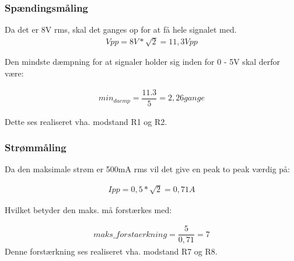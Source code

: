 \subsubsection{Spændingsmåling}
Da det er 8V rms, skal det ganges op for at få hele signalet med.
\begin{align}
Vpp = 8V*\sqrt{2} = 11,3Vpp
\end{align}

Den mindste dæmpning for at signaler holder sig inden for 0 - 5V skal derfor være:

\begin{align}
min_{daemp} = \dfrac{11.3}{5} = 2,26 gange
\end{align}

Dette ses realiseret vha. modstand R1 og R2.

\subsubsection{Strømmåling}

Da  den maksimale strøm er 500mA rms vil det give en peak to peak værdig på:

\begin{align}
Ipp = 0,5*\sqrt{2} = 0,71A
\end{align}

Hvilket betyder den maks. må forstærkes med:

\begin{align}
maks\_forstaerkning = \dfrac{5}{0,71} = 7
\end{align}
Denne forstærkning ses realiseret vha. modstand R7 og R8.  



 